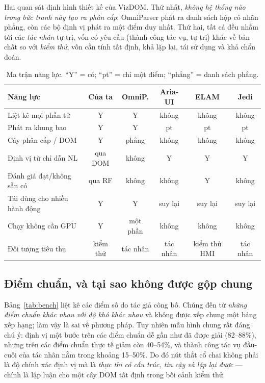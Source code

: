 \documentclass[11pt,a4paper]{article}
\begin{document}
Hai quan sát định hình thiết kế của VizDOM. Thứ nhất, \emph{không hệ thống nào trong
bức tranh này tạo ra phân cấp}: OmniParser phát ra danh sách hộp có nhãn phẳng, còn
các bộ định vị phát ra một điểm duy nhất. Thứ hai, tất cả đều nhắm tới các
\emph{tác nhân} tự trị, vốn có yêu cầu (thành công tác vụ, tự trị) khác về bản chất
so với \emph{kiểm thử}, vốn cần tính tất định, khả lặp lại, tái sử dụng và khả chẩn
đoán.

\begin{table}[H]
  \centering\footnotesize
  \caption{Ma trận năng lực. ``Y'' = có; ``pt'' = chỉ một điểm; ``phẳng'' = danh sách phẳng.}
  \label{tab:capability}
  \begin{tabular}{@{}p{5.2cm}ccccc@{}}
    \toprule
    Năng lực & Của ta & OmniP. & Aria-UI & ELAM & Jedi \\
    \midrule
    Liệt kê mọi phần tử & Y & Y & không & không & không \\
    Phát ra khung bao & Y & Y & pt & pt & pt \\
    Cây phân cấp / DOM & Y & phẳng & không & không & không \\
    Định vị từ chỉ dẫn NL & qua DOM & không & Y & Y & Y \\
    Đánh giá đạt/không sẵn có & qua RF & không & không & Y & không \\
    Tái dùng cho nhiều hành động & Y & Y & suy lại & suy lại & suy lại \\
    Chạy không cần GPU & Y & một phần & không & không & không \\
    Đối tượng tiêu thụ & kiểm thử & tác nhân & tác nhân & kiểm thử HMI & tác nhân \\
    \bottomrule
  \end{tabular}
\end{table}

\subsection{Điểm chuẩn, và tại sao không được gộp chung}
Bảng~\ref{tab:bench} liệt kê các điểm số do tác giả công bố. Chúng đến từ
\emph{những điểm chuẩn khác nhau với độ khó khác nhau} và không được xếp chung một
bảng xếp hạng; làm vậy là sai về phương pháp. Tuy nhiên mẫu hình chung rất đáng chú
ý: định vị một bước trên các điểm chuẩn dễ gần như đã được giải (82--88\%), nhưng
trên các điểm chuẩn thực tế giảm còn 40--54\%, và thành công tác vụ đầu-cuối của tác
nhân nằm trong khoảng 15--50\%. Do đó nút thắt cổ chai không phải là độ chính xác
định vị mà là \emph{thực thi có cấu trúc, tin cậy và lặp lại được} --- chính là lập
luận cho một cây DOM tất định trong bối cảnh kiểm thử.
\end{document}
